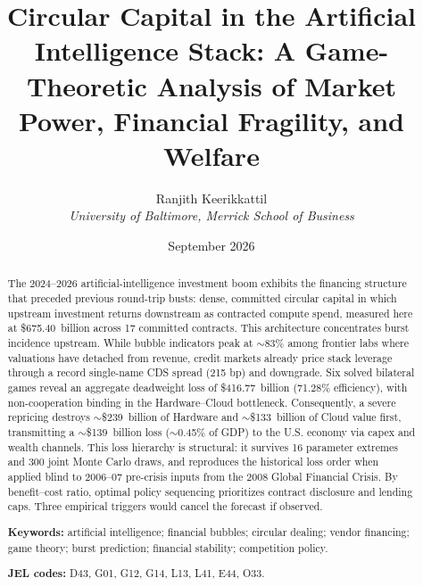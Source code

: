 \documentclass[11pt,a4paper]{article}
\title{Circular Capital in the Artificial Intelligence Stack:
A Game-Theoretic Analysis of Market Power, Financial Fragility, and Welfare}
\author{Ranjith Keerikkattil \\
\small\textit{University of Baltimore, Merrick School of Business}}
\date{September 2026}
\begin{document}
\maketitle
\begin{abstract}
\noindent The 2024--2026 artificial-intelligence investment boom exhibits the
financing structure that preceded previous round-trip busts: dense,
committed circular capital in which upstream investment returns
downstream as contracted compute spend, measured here at \$675.40~billion
across 17 committed contracts. This architecture concentrates burst
incidence upstream. While bubble indicators peak at $\sim$83\% among
frontier labs where valuations have detached from revenue, credit
markets already price stack leverage through a record single-name CDS
spread (215 bp) and downgrade. Six solved bilateral games reveal an
aggregate deadweight loss of \$416.77~billion (71.28\% efficiency),
with non-cooperation binding in the Hardware--Cloud bottleneck.
Consequently, a severe repricing destroys $\sim$\$239~billion of Hardware
and $\sim$\$133~billion of Cloud value first, transmitting a $\sim$\$139~billion
loss ($\sim$0.45\% of GDP) to the U.S. economy via capex and
wealth channels. This loss hierarchy is structural: it survives 16
parameter extremes and 300 joint Monte Carlo draws, and reproduces the
historical loss order when applied blind to 2006--07 pre-crisis inputs from
the 2008 Global Financial Crisis. By benefit--cost ratio, optimal policy sequencing prioritizes
contract disclosure and lending caps. Three empirical
triggers would cancel the forecast if observed.
\medskip

\noindent\textbf{Keywords:} artificial intelligence; financial bubbles;
circular dealing; vendor financing; game theory; burst prediction;
financial stability; competition policy.
\medskip

\noindent\textbf{JEL codes:} D43, G01, G12, G14, L13, L41, E44, O33.
\end{abstract}
\begingroup
\setlength{\parskip}{0pt}
\small\tableofcontents
\endgroup
\newpage
\end{document}
